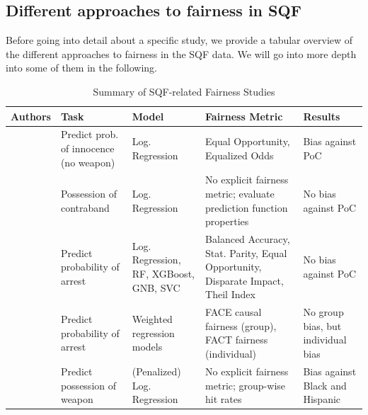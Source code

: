 



\subsection{Different approaches to fairness in SQF}

Before going into detail about a specific study, we provide a tabular overview of the different approaches to fairness in the SQF data. We will go into more depth into some of them in the following.

\begin{table}[h]
    \centering
        \begin{tabular}{|m{2cm}|m{3cm}|m{2.5cm}|m{3.5cm}|m{3cm}|}
            \hline
            \textbf{Authors} & \textbf{Task} & \textbf{Model} & \textbf{Fairness Metric} & \textbf{Results} \\
            \hline
            \cite{kallus2018} 
            & Predict prob. of innocence (no weapon) 
            & Log. Regression 
            & Equal Opportunity, Equalized Odds 
            & Bias against PoC \\ 
            \hline
            \cite{rambachan2016} 
            & Possession of contraband
            & Log. Regression 
            & No explicit fairness metric; evaluate prediction function properties 
            & No bias against PoC\\
            \hline
            \cite{Badr2022DTFANSP} 
            & Predict probability of arrest 
            & Log. Regression, RF, XGBoost, GNB, SVC 
            & Balanced Accuracy, Stat. Parity, Equal Opportunity, Disparate Impact, Theil Index 
            & No bias against PoC \\ 
            \hline
            \cite{Khademi2019FADMELC} 
            & Predict probability of arrest 
            & Weighted regression models
            & FACE causal fairness (group), FACT fairness (individual) 
            & No group bias, but individual bias \\ 
            \hline
            \cite{goel2016} 
            & Predict possession of weapon 
            & (Penalized) Log. Regression 
            & No explicit fairness metric; group-wise hit rates 
            & Bias against Black and Hispanic\\ 
            \hline
        \end{tabular}
        \caption{Summary of SQF-related Fairness Studies}
        \label{tab:sqf_summary}
\end{table}

